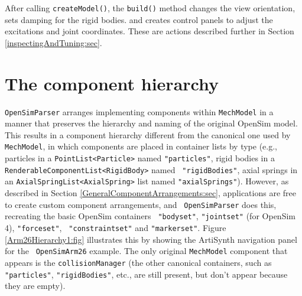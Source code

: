 After calling {\tt createModel()}, the {\tt build()} method changes the view
orientation, sets damping for the rigid bodies. and creates control panels to
adjust the excitations and joint coordinates. These are actions described
further in Section \ref{inspectingAndTuning:sec}.

\section{The component hierarchy}
\label{OpenSimHierarchy:sec}

{\tt OpenSimParser} arranges implementing components within {\tt MechModel} in a
manner that preserves the hierarchy and naming of the original OpenSim
model. This results in a component hierarchy different from the canonical one
used by {\tt MechModel}, in which components are placed in container lists by
type (e.g., particles in a {\tt PointList<Particle>} named {\tt "particles"},
rigid bodies in a {\tt RenderableComponentList<RigidBody>} named {\tt
"rigidBodies"}, axial springs in an {\tt AxialSpringList<AxialSpring>} list
named {\tt "axialSprings"}). However, as described in Section 
\ref{GeneralComponentArrangements:sec}, 
applications are free to create custom component arrangements, and {\tt
OpenSimParser} does this, recreating the basic OpenSim containers {\tt
"bodyset"}, {\tt "jointset"} (for OpenSim 4), {\tt "forceset"}, {\tt
"constraintset"} and {\tt "markerset"}. Figure \ref{Arm26Hierarchy1:fig}
illustrates this by showing the ArtiSynth navigation panel for the {\tt
OpenSimArm26} example. The only original {\tt MechModel} component that appears
is the {\tt collisionManager} (the other canonical containers, such as {\tt
"particles"}, {\tt "rigidBodies"}, etc., are still present, but don't appear
because they are empty).

